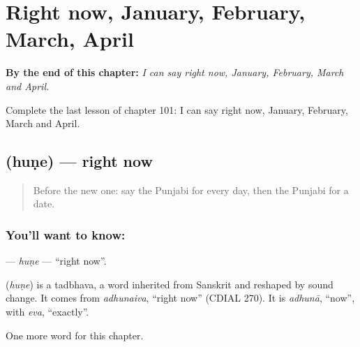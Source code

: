 
\chapter{Right now, January, February, March, April}
\label{ch:pa-right-now-january-february-march-april}

\begin{chapteropening}
\textbf{By the end of this chapter:} \emph{I can say right now, January, February, March and April.}

Complete the last lesson of chapter 101: I can say right now, January, February, March and April.
\end{chapteropening}

\section[\texorpdfstring{\pa{ਹੁਣੇ} (huṇe)}{ਹੁਣੇ (huṇe)}]{ (huṇe) — right now}

\label{lesson:PA-C101-hune}



\begin{quote}
Before the new one: say the Punjabi for every day, then the Punjabi for a date.
\end{quote}

\subsection*{You'll want to know: }
\textbf{} — \emph{huṇe} — \textquotedblleft{}right now\textquotedblright{}.

\begin{cousinweb}
\textbf{} (\emph{huṇe}) is a tadbhava, a word inherited from Sanskrit and reshaped by sound change. It comes from \emph{adhunaiva}, \textquotedblleft{}right now\textquotedblright{} (CDIAL 270). It is \emph{adhunā}, \textquotedblleft{}now\textquotedblright{}, with \emph{eva}, \textquotedblleft{}exactly\textquotedblright{}.
\end{cousinweb}

\begin{grammarlens}[title={What you've built}]
One more word for this chapter.
\end{grammarlens}

